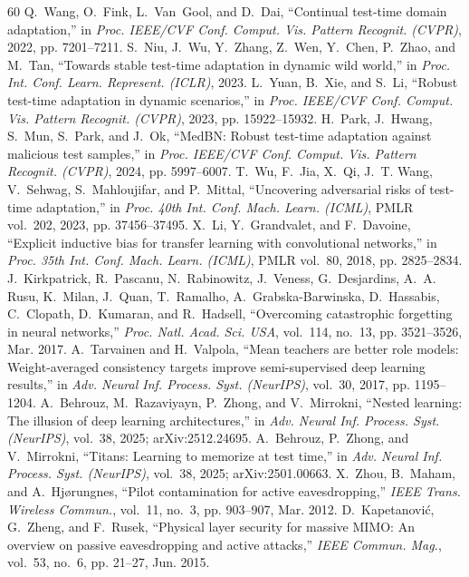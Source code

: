 \documentclass[journal]{IEEEtran}
\theoremstyle{remark}
\begin{document}
\begin{thebibliography}{60}
 Q.~Wang, O.~Fink, L.~Van~Gool, and D.~Dai, ``Continual test-time domain adaptation,'' in \emph{Proc. IEEE/CVF Conf. Comput. Vis. Pattern Recognit. (CVPR)}, 2022, pp. 7201--7211.
 S.~Niu, J.~Wu, Y.~Zhang, Z.~Wen, Y.~Chen, P.~Zhao, and M.~Tan, ``Towards stable test-time adaptation in dynamic wild world,'' in \emph{Proc. Int. Conf. Learn. Represent. (ICLR)}, 2023.
 L.~Yuan, B.~Xie, and S.~Li, ``Robust test-time adaptation in dynamic scenarios,'' in \emph{Proc. IEEE/CVF Conf. Comput. Vis. Pattern Recognit. (CVPR)}, 2023, pp. 15922--15932.
 H.~Park, J.~Hwang, S.~Mun, S.~Park, and J.~Ok, ``MedBN: Robust test-time adaptation against malicious test samples,'' in \emph{Proc. IEEE/CVF Conf. Comput. Vis. Pattern Recognit. (CVPR)}, 2024, pp. 5997--6007.
 T.~Wu, F.~Jia, X.~Qi, J.~T. Wang, V.~Sehwag, S.~Mahloujifar, and P.~Mittal, ``Uncovering adversarial risks of test-time adaptation,'' in \emph{Proc. 40th Int. Conf. Mach. Learn. (ICML)}, PMLR vol.~202, 2023, pp. 37456--37495.
 X.~Li, Y.~Grandvalet, and F.~Davoine, ``Explicit inductive bias for transfer learning with convolutional networks,'' in \emph{Proc. 35th Int. Conf. Mach. Learn. (ICML)}, PMLR vol.~80, 2018, pp. 2825--2834.
 J.~Kirkpatrick, R.~Pascanu, N.~Rabinowitz, J.~Veness, G.~Desjardins, A.~A. Rusu, K.~Milan, J.~Quan, T.~Ramalho, A.~Grabska-Barwinska, D.~Hassabis, C.~Clopath, D.~Kumaran, and R.~Hadsell, ``Overcoming catastrophic forgetting in neural networks,'' \emph{Proc. Natl. Acad. Sci. USA}, vol.~114, no.~13, pp. 3521--3526, Mar. 2017.
 A.~Tarvainen and H.~Valpola, ``Mean teachers are better role models: Weight-averaged consistency targets improve semi-supervised deep learning results,'' in \emph{Adv. Neural Inf. Process. Syst. (NeurIPS)}, vol.~30, 2017, pp. 1195--1204.
 A.~Behrouz, M.~Razaviyayn, P.~Zhong, and V.~Mirrokni, ``Nested learning: The illusion of deep learning architectures,'' in \emph{Adv. Neural Inf. Process. Syst. (NeurIPS)}, vol.~38, 2025; arXiv:2512.24695.
 A.~Behrouz, P.~Zhong, and V.~Mirrokni, ``Titans: Learning to memorize at test time,'' in \emph{Adv. Neural Inf. Process. Syst. (NeurIPS)}, vol.~38, 2025; arXiv:2501.00663.
 X.~Zhou, B.~Maham, and A.~Hj{\o}rungnes, ``Pilot contamination for active eavesdropping,'' \emph{IEEE Trans. Wireless Commun.}, vol.~11, no.~3, pp. 903--907, Mar. 2012.
 D.~Kapetanovi\'c, G.~Zheng, and F.~Rusek, ``Physical layer security for massive MIMO: An overview on passive eavesdropping and active attacks,'' \emph{IEEE Commun. Mag.}, vol.~53, no.~6, pp. 21--27, Jun. 2015.

\end{thebibliography}
\end{document}
